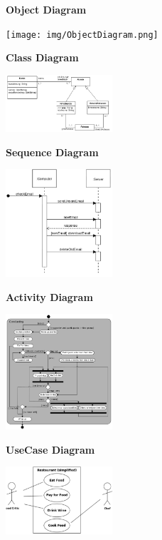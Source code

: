 \documentclass{report}
\newenvironment{Figure}
	{\par\medskip\noindent\minipage{\linewidth}}
	{\endminipage\par\medskip}
\theoremstyle{definition}
\theoremstyle{example}
\begin{document}
\textbf{Object Diagram}
\begin{Figure}
\centering
\texttt{[image: img/ObjectDiagram.png]}
	\label{fig:Beispiel eines Object Diagram nach UML}
\end{Figure}

\textbf{Class Diagram}
\begin{Figure}
\centering
\includegraphics[width=150px]{img/ClassDiagram.png}
	\label{fig:Beispiel eines Class Diagram nach UML}
\end{Figure}

\textbf{Sequence Diagram}
\begin{Figure}
\centering
\includegraphics[width=150px]{img/SequenceDiagramm.png}
	\label{fig:Beispiel eines Sequence Diagram nach UML}
\end{Figure}

\textbf{Activity Diagram}
\begin{Figure}
\centering
\includegraphics[width=150px]{img/ActivityDiagram.png}
	\label{fig:Beispiel eines Activity Diagram nach UML}
\end{Figure}

\textbf{UseCase Diagram}
\begin{Figure}
\centering
\includegraphics[width=150px]{img/UseCaseDiagram.png}
	\label{fig:Beispiel eines UseCase Diagram nach UML}
\end{Figure}
\end{document}
